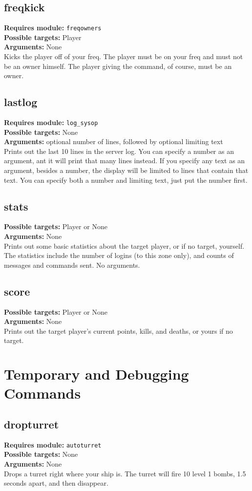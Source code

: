 \documentclass{article}
\newcommand{\requiremod}[1]{\noindent\textbf{Requires module:} \texttt{#1}\\}
\newcommand{\targets}[1]{\noindent\textbf{Possible targets:} #1\\}
\newcommand{\args}[1]{\noindent\textbf{Arguments:} #1\\}
\begin{document}
\subsection{freqkick}  %
\requiremod{freqowners}
\targets{Player}
\args{None}
Kicks the player off of your freq. The player must be on your freq and
must not be an owner himself. The player giving the command, of course,
must be an owner.

\subsection{lastlog}  %
\requiremod{log\_sysop}
\targets{None}
\args{optional number of lines, followed by optional limiting text}
Prints out the last 10 lines in the server log. You can specify a number
as an argument, ant it will print that many lines instead. If you
specify any text as an argument, besides a number, the display will be
limited to lines that contain that text. You can specify both a number
and limiting text, just put the number first.

\subsection{stats}  %
\targets{Player or None}
\args{None}
Prints out some basic statistics about the target player, or if no
target, yourself. The statistics include the number of logins (to this
zone only), and counts of messages and commands sent. No arguments.

\subsection{score}  %
\targets{Player or None}
\args{None}
Prints out the target player's current points, kills, and deaths, or
yours if no target.


\section{Temporary and Debugging Commands}

\subsection{dropturret}  %
\requiremod{autoturret}
\targets{None}
\args{None}
Drops a turret right where your ship is. The turret will fire 10 level 1
bombs, 1.5 seconds apart, and then disappear.
\end{document}
